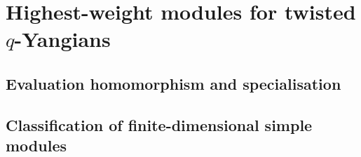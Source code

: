 \section{\texorpdfstring{Highest-weight modules for twisted $q$-Yangians}{}}
    \subsection{Evaluation homomorphism and specialisation}



    \subsection{Classification of finite-dimensional simple modules}